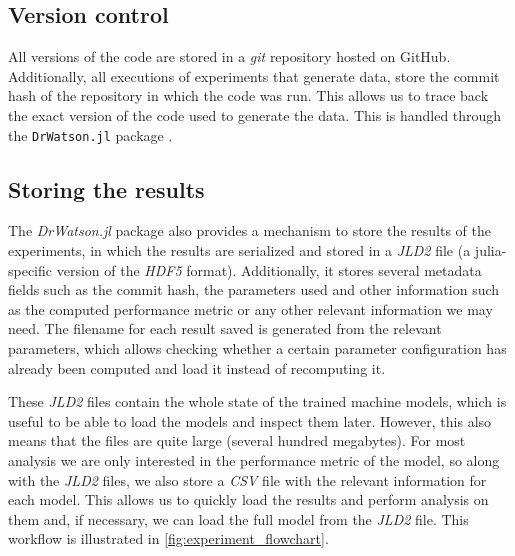 \subsection{Version control}

All versions of the code are stored in a \emph{git} repository hosted on GitHub. %
Additionally, all executions of experiments that generate data, store the commit hash of the
repository in which the code was run. This allows us to trace back the exact version of the code
used to generate the data. This is handled through the \texttt{DrWatson.jl} package \cite{datserisDrWatsonPerfectSidekick2020a}.

\subsection{Storing the results}

The \emph{DrWatson.jl} package also provides a mechanism to store the results of the experiments, in
which the results are serialized and stored in a \emph{JLD2} file (a julia-specific version of the \emph{HDF5} format).
Additionally, it stores several metadata fields such as the commit hash, the parameters used and other
information such as the computed performance metric or any other relevant information we may need.
The filename for each result saved is generated from the relevant parameters, which
allows checking whether a certain parameter configuration has already been computed and load it instead of recomputing it.

These \emph{JLD2} files contain the whole state of the trained machine models, which is useful to be able
to load the models and inspect them later. However, this also means that the files are quite large (several
hundred megabytes). For most analysis we are only interested in the performance metric of the model, so
along with the \emph{JLD2} files, we also store a \emph{CSV} file with the relevant information for each
model. This allows us to quickly load the results and perform analysis on them and, if necessary, we can load
the full model from the \emph{JLD2} file.
This workflow is illustrated in \cref{fig:experiment_flowchart}.

